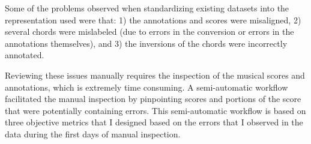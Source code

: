 
Some of the problems observed when standardizing existing
datasets into the representation used were that: 1) the
annotations and scores were misaligned, 2) several chords
were mislabeled (due to errors in the conversion or errors
in the annotations themselves), and 3) the inversions of the
chords were incorrectly annotated.

Reviewing these issues manually requires the inspection of
the musical scores and annotations, which is extremely time
consuming. A semi-automatic workflow facilitated the manual
inspection by pinpointing scores and portions of the score
that were potentially containing errors. This semi-automatic
workflow is based on three objective metrics that I designed
based on the errors that I observed in the data during the
first days of manual inspection.

